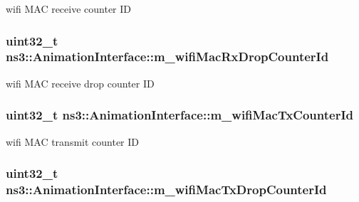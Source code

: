 wifi M\+AC receive counter ID 

\subsubsection[{\texorpdfstring{m\+\_\+wifi\+Mac\+Rx\+Drop\+Counter\+Id}{m_wifiMacRxDropCounterId}}]{\setlength{\rightskip}{0pt plus 5cm}uint32\+\_\+t ns3\+::\+Animation\+Interface\+::m\+\_\+wifi\+Mac\+Rx\+Drop\+Counter\+Id\hspace{0.3cm}{\ttfamily [private]}}\hypertarget{classns3_1_1AnimationInterface_ad8ff0ee590e7c76a22b03cb98299284f}{}\label{classns3_1_1AnimationInterface_ad8ff0ee590e7c76a22b03cb98299284f}


wifi M\+AC receive drop counter ID 

\subsubsection[{\texorpdfstring{m\+\_\+wifi\+Mac\+Tx\+Counter\+Id}{m_wifiMacTxCounterId}}]{\setlength{\rightskip}{0pt plus 5cm}uint32\+\_\+t ns3\+::\+Animation\+Interface\+::m\+\_\+wifi\+Mac\+Tx\+Counter\+Id\hspace{0.3cm}{\ttfamily [private]}}\hypertarget{classns3_1_1AnimationInterface_a839ac18c36b5fa23aba8062c20048594}{}\label{classns3_1_1AnimationInterface_a839ac18c36b5fa23aba8062c20048594}


wifi M\+AC transmit counter ID 

\subsubsection[{\texorpdfstring{m\+\_\+wifi\+Mac\+Tx\+Drop\+Counter\+Id}{m_wifiMacTxDropCounterId}}]{\setlength{\rightskip}{0pt plus 5cm}uint32\+\_\+t ns3\+::\+Animation\+Interface\+::m\+\_\+wifi\+Mac\+Tx\+Drop\+Counter\+Id\hspace{0.3cm}{\ttfamily [private]}}\hypertarget{classns3_1_1AnimationInterface_aa4543b178ed88dc98eb8976eaccca092}{}\label{classns3_1_1AnimationInterface_aa4543b178ed88dc98eb8976eaccca092}


